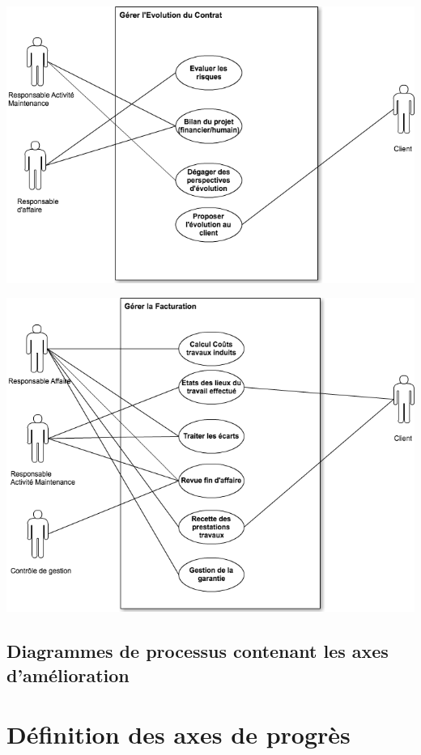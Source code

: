 \begin {center}
\includegraphics[width=\textwidth]{png_generaux/DCUGererEvolutionContrat.png}
\end {center}

\begin {center}
\includegraphics[width=\textwidth]{png_generaux/DCUGererFacturation.png}
\end {center}

\subsection{Diagrammes de processus contenant les axes d'amélioration}

\section{Définition des axes de progrès}

